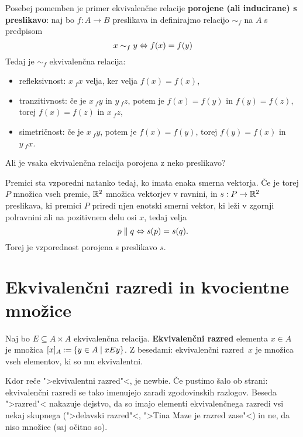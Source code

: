 Posebej pomemben je primer ekvivalenčne relacije \textbf{porojene (ali inducirane) s preslikavo}:
naj bo $f : A \to B$ preslikava in definirajmo relacijo $\sim_f$ na $A$ s predpisom
%
\begin{equation*}
  x \sim_f y \Leftrightarrow f(x) = f(y)
\end{equation*}
%
Tedaj je $\sim_f$ ekvivalenčna relacija:
%
\begin{itemize}
\item refleksivnost: $x ~_f x$ velja, ker velja $f(x) = f(x)$,
\item tranzitivnost: če je $x ~_f y$ in $y ~_f z$, potem je $f(x) = f(y)$ in $f(y) = f(z)$, torej $f(x) = f(z)$ in $x ~_f z$,
\item simetričnost: če je $x ~_f y$, potem je $f(x) = f(y)$, torej $f(y) = f(x)$ in $y ~_f x$.
\end{itemize}
%
Ali je vsaka ekvivalenčna relacija porojena z neko preslikavo?

\begin{primer}
  Premici sta vzporedni natanko tedaj, ko imata enaka smerna vektorja. Če je
  torej $P$ množica vseh premic, $\mathbb{R}^2$ množica vektorjev v ravnini, in $s : P \to \mathbb{R}^2$
  preslikava, ki premici $P$ priredi njen enotski smerni vektor, ki leži v zgornji polravnini ali
  na pozitivnem delu osi $x$, tedaj velja
  \begin{equation*}
    p \parallel q \Leftrightarrow s(p) = s(q).
  \end{equation*}
  Torej je vzporednost porojena s preslikavo $s$.
\end{primer}

\section{Ekvivalenčni razredi in kvocientne množice}

\begin{definicija}
  Naj bo $E \subseteq A \times A$ ekvivalenčna relacija. \textbf{Ekvivalenčni razred} elementa $x \in A$ je množica
  $[x]_A \mathbin{{:}{=}} \left\{ y \in A \; \middle| \; x E y \right\}$. Z besedami: ekvivalenčni razred~$x$ je množica vseh elementov, ki so mu
  ekvivalentni.
\end{definicija}

\begin{opomba}
  Kdor reče ">ekvivalentni razred"<, je newbie.
  Če pustimo šalo ob strani: ekvivalenčni razredi se tako imenujejo zaradi zgodovinskih razlogov. Beseda ">razred"< nakazuje dejstvo, da so imajo elementi ekvivalenčnega razredi vsi nekaj skupnega (">delavski razred"<, ">Tina Maze je razred zase"<) in ne, da niso množice (saj očitno so).
\end{opomba}

